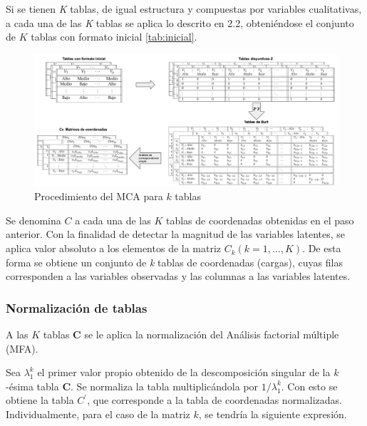 \documentclass[mathematics,article,submit,moreauthors,pdftex]{mdpi}
\begin{document}
Si se tienen \emph{K} tablas, de igual estructura y compuestas por
variables cualitativas, a cada una de las \emph{K} tablas se aplica lo
descrito en 2.2, obteniéndose el conjunto de \(K\) tablas con formato
inicial \ref{tab:inicial}.

\begin{figure}[!ht]


\begin{center}\includegraphics[width=0.9\linewidth,]{ktablesMCA} \end{center}

\caption{Procedimiento del MCA para $k$ tablas}

\label{fig:MCAk}
\end{figure}

Se denomina \(C\) a cada una de las \(K\) tablas de coordenadas
obtenidas en el paso anterior. Con la finalidad de detectar la magnitud
de las variables latentes, se aplica valor absoluto a los elementos de
la matriz \(C_{k} (k=1,…, K)\). De esta forma se obtiene un conjunto de
\emph{k} tablas de coordenadas (cargas), cuyas filas corresponden a las
variables observadas y las columnas a las variables latentes.

\hypertarget{normalizaciuxf3n-de-tablas}{%
\subsubsection{Normalización de
tablas}\label{normalizaciuxf3n-de-tablas}}

A las \(K\) tablas \textbf{C} se le aplica la normalización \citep{AFM}
del Análisis factorial múltiple (MFA).

Sea \(\lambda_{1}^{k}\) el primer valor propio obtenido de la
descomposición singular de la \(k\)-ésima tabla \textbf{C}. Se normaliza
la tabla multiplicándola por \(1/\lambda_{1}^{k}\). Con esto se obtiene
la tabla \(C^{'}\), que corresponde a la tabla de coordenadas
normalizadas.\\
Individualmente, para el caso de la matriz \(k\), se tendría la
siguiente expresión.
\end{document}
